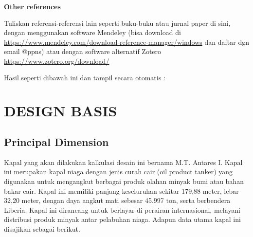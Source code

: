 \documentclass[12pt,a4paper,twoside,openright]{book}
\theoremstyle{definition}
\theoremstyle{plain}
\theoremstyle{remark}
\begin{document}
\medskip
\noindent\textbf{Other references}

\noindent Tuliskan referensi-referensi lain seperti buku-buku atau jurnal paper di sini, dengan menggunakan software Mendeley (bisa download di \url{https://www.mendeley.com/download-reference-manager/windows} dan daftar dgn email @ppns) atau dengan software alternatif Zotero \url{https://www.zotero.org/download/}

\medskip
\noindent Hasil seperti dibawah ini dan tampil secara otomatis :

\nocite{*}



\chapter{DESIGN BASIS}

\section{Principal Dimension}

Kapal yang akan dilakukan kalkulasi desain ini bernama M.T. Antares I. Kapal ini merupakan kapal niaga dengan jenis curah cair (oil product tanker) yang digunakan untuk mengangkut berbagai produk olahan minyak bumi atau bahan bakar cair. Kapal ini memiliki panjang keseluruhan sekitar 179,88 meter, lebar 32,20 meter, dengan daya angkut mati sebesar 45.997 ton, serta berbendera Liberia. Kapal ini dirancang untuk berlayar di perairan internasional, melayani distribusi produk minyak antar pelabuhan niaga. Adapun data utama kapal ini disajikan sebagai berikut.
\end{document}
